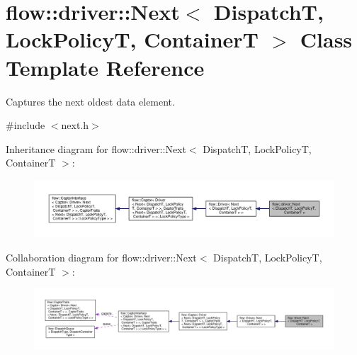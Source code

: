 \hypertarget{classflow_1_1driver_1_1_next}{}\section{flow\+:\+:driver\+:\+:Next$<$ DispatchT, Lock\+PolicyT, ContainerT $>$ Class Template Reference}
\label{classflow_1_1driver_1_1_next}


Captures the next oldest data element.  




{\ttfamily \#include $<$next.\+h$>$}



Inheritance diagram for flow\+:\+:driver\+:\+:Next$<$ DispatchT, Lock\+PolicyT, ContainerT $>$\+:\nopagebreak
\begin{figure}[H]
\begin{center}
\leavevmode
\includegraphics[width=350pt]{classflow_1_1driver_1_1_next__inherit__graph}
\end{center}
\end{figure}


Collaboration diagram for flow\+:\+:driver\+:\+:Next$<$ DispatchT, Lock\+PolicyT, ContainerT $>$\+:\nopagebreak
\begin{figure}[H]
\begin{center}
\leavevmode
\includegraphics[width=350pt]{classflow_1_1driver_1_1_next__coll__graph}
\end{center}
\end{figure}
